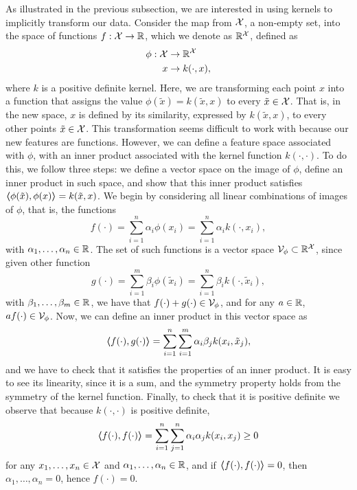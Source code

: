 As illustrated in the previous subsection, we are interested in using kernels to implicitly transform our data. Consider the map from $\mathcal{X}$, a non-empty set, into the space of functions $f: \mathcal{X} \to \mathbb{R}$, which we denote as $\mathbb{R}^{\mathcal{X}}$, defined as 
    \begin{equation}
        \begin{aligned}
            \nonumber
            \phi: \mathcal{X} &\to \mathbb{R}^{\mathcal{X}} \\
            x &\to k(\cdot, x) ,
        \end{aligned}
    \end{equation}
where $k$ is a positive definite kernel. Here, we are transforming each point $x$ into a function that assigns the value $\phi(\tilde{x}) = k(\tilde{x}, x)$ to every $\tilde{x} \in \mathcal{X}$. That is, in the new space, $x$ is defined by its similarity, expressed by $k(\tilde{x}, x)$, to every other points $\tilde{x} \in \mathcal{X}$. This transformation seems difficult to work with because our new features are functions.
However, we can define a feature space associated with $\phi$, with an inner product associated with the kernel function $k(\cdot, \cdot)$. To do this, we follow three steps: we define a vector space on the image of $\phi$, define an inner product in such space, and show that this inner product satisfies $\bm{\left\langle} \phi(\tilde{x}), \phi(x) \bm{\right\rangle} = k(\tilde{x}, x)$.
We begin by considering all linear combinations of images of $\phi$, that is, the functions 
$$ f(\cdot) = \sum_{i=1}^n \alpha_i \phi(x_i) =\sum_{i=1}^n \alpha_i k(\cdot, x_i), $$
with $\alpha_1, \ldots, \alpha_n \in \mathbb{R}$.
The set of such functions is a vector space $\mathcal{V}_\phi \subset \mathbb{R}^{\mathcal{X}}$, since given other function 
$$ g(\cdot) = \sum_{i=1}^m \beta_i \phi(\tilde{x}_i) =\sum_{i=1}^n \beta_i k(\cdot, \tilde{x}_i) ,$$
with $\beta_1, \ldots, \beta_m \in \mathbb{R}$,
we have that $f(\cdot) + g(\cdot) \in \mathcal{V}_\phi$, and for any $a \in \mathbb{R}$,  $a f(\cdot) \in \mathcal{V}_\phi$.
Now, we can define an inner product in this vector space as 
$$ \bm{\left\langle} f(\cdot), g(\cdot) \bm{\right\rangle} = \sum_{i=1}^n \sum_{i=1}^m \alpha_i \beta_j k(x_i, \tilde{x}_j),$$
and we have to check that it satisfies the properties of an inner product. It is easy to see its linearity, since it is a sum, and the symmetry property holds from the symmetry of the kernel function. Finally, to check that it is positive definite we observe that because $k(\cdot, \cdot)$ is positive definite,
$$ \bm{\left\langle} f(\cdot), f(\cdot) \bm{\right\rangle} = \sum_{i=1}^n \sum_{j=1}^n \alpha_i \alpha_j k(x_i, x_j) \geq 0$$
for any $x_1, \ldots, x_n \in \mathcal{X}$ and $\alpha_1, \ldots, \alpha_n \in \mathbb{R}$, and if $\bm{\left\langle} f(\cdot), f(\cdot) \bm{\right\rangle} = 0$, then $\alpha_1, \ldots, \alpha_n =0$, hence $f(\cdot) = 0$.
